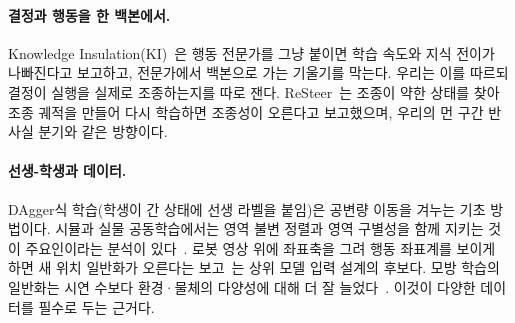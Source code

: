 \paragraph{결정과 행동을 한 백본에서.}
Knowledge Insulation(KI)~\cite{kinsulate2025}은 행동 전문가를 그냥 붙이면 학습 속도와 지식 전이가 나빠진다고 보고하고, 전문가에서 백본으로 가는 기울기를 막는다. 우리는 이를 따르되 결정이 실행을 실제로 조종하는지를 따로 잰다. ReSteer~\cite{resteer2026}는 조종이 약한 상태를 찾아 조종 궤적을 만들어 다시 학습하면 조종성이 오른다고 보고했으며, 우리의 먼 구간 반사실 분기와 같은 방향이다.

\paragraph{선생-학생과 데이터.}
DAgger식 학습(학생이 간 상태에 선생 라벨을 붙임)은 공변량 이동을 겨누는 기초 방법이다. 시뮬과 실물 공동학습에서는 영역 불변 정렬과 영역 구별성을 함께 지키는 것이 주요인이라는 분석이 있다~\cite{cotrainmech2026}. 로봇 영상 위에 좌표축을 그려 행동 좌표계를 보이게 하면 새 위치 일반화가 오른다는 보고~\cite{axisguide2026}는 상위 모델 입력 설계의 후보다. 모방 학습의 일반화는 시연 수보다 환경·물체의 다양성에 대해 더 잘 늘었다~\cite{datascaling2025}. 이것이 다양한 데이터를 필수로 두는 근거다.

